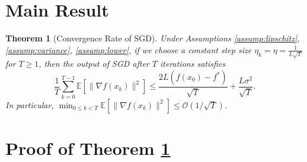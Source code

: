 \documentclass{article}
\newtheorem{theorem}{Theorem}
\begin{document}
\section{Main Result}
\begin{theorem}[Convergence Rate of SGD] \label{thm:main}
    Under Assumptions \ref{assump:lipschitz}, \ref{assump:variance}, \ref{assump:lower}, if we choose a constant step size $\eta_k = \eta = \frac{1}{L\sqrt{T}}$ for $T \ge 1$, then the output of SGD after $T$ iterations satisfies
    \begin{equation}
        \frac{1}{T}\sum_{k=0}^{T-1} \mathbb{E}[\|\nabla f(x_k)\|^2] \le \frac{2L(f(x_0)-f^*)}{\sqrt{T}} + \frac{L\sigma^2}{\sqrt{T}}.
    \end{equation}
    In particular, $\min_{0\le k < T} \mathbb{E}[\|\nabla f(x_k)\|^2] \le \mathcal{O}(1/\sqrt{T})$.
\end{theorem}

\section{Proof of Theorem \ref{thm:main}}
\end{document}
